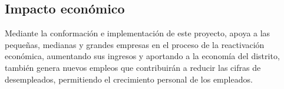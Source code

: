 \subsection{Impacto económico}

Mediante la conformación e implementación de este proyecto, apoya a las pequeñas, medianas y grandes empresas en el proceso de la reactivación económica, aumentando sus ingresos y aportando a la economía del distrito, también genera nuevos empleos que contribuirán a reducir las cifras de desempleados, permitiendo el crecimiento personal de los empleados.